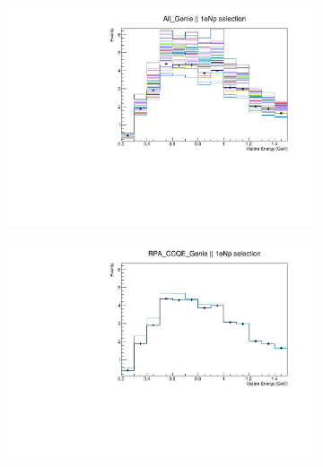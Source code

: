 \documentclass[a4paper]{article}
\begin{document}
\begin{figure}[ht] 
\begin{center}
    \begin{subfigure}[b]{0.33\textwidth}
    \centering
    \includegraphics[width=1.00\textwidth]{systvariations/Variation_nue_reco_e_genietune_run1_All_Genie_nu_uBooNE_nue_intrinsic.pdf}
    \end{subfigure}
    \begin{subfigure}[b]{0.33\textwidth}
    \centering
    \includegraphics[width=1.00\textwidth]{systvariations/Variation_nue_reco_e_genietune_run1_RPA_CCQE_Genie_nu_uBooNE_nue_intrinsic.pdf}
    \end{subfigure}

\end{center}
\end{figure}
\end{document}
